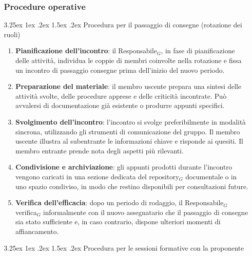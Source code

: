 \documentclass[a4paper, 10pt]{article}
\makeatletter
\renewcommand\paragraph{\@startsection{paragraph}{4}{\z@}%
  {3.25ex \@plus1ex \@minus .2ex}%
  {1.5ex \@plus .2ex}%
  {\normalfont\normalsize\bfseries}}
\makeatother
\begin{document}
\subsubsection{Procedure operative}
\label{subsubsec:procedure_formazione}

\paragraph{Procedura per il passaggio di consegne (rotazione dei ruoli)}

\begin{enumerate}
    \item \textbf{Pianificazione dell'incontro}: il Responsabile$_G$, in fase di pianificazione delle attività, individua le coppie di membri coinvolte nella rotazione e fissa un incontro di passaggio consegne prima dell'inizio del nuovo periodo.
    \item \textbf{Preparazione del materiale}: il membro uscente prepara una sintesi delle attività svolte, delle procedure apprese e delle criticità incontrate. Può avvalersi di documentazione già esistente o produrre appunti specifici.
    \item \textbf{Svolgimento dell'incontro}: l'incontro si svolge preferibilmente in modalità sincrona, utilizzando gli strumenti di comunicazione del gruppo. Il membro uscente illustra al subentrante le informazioni chiave e risponde ai quesiti. Il membro entrante prende nota degli aspetti più rilevanti.
    \item \textbf{Condivisione e archiviazione}: gli appunti prodotti durante l'incontro vengono caricati in una sezione dedicata del repository$_G$ documentale o in uno spazio condiviso, in modo che restino disponibili per consultazioni future.
    \item \textbf{Verifica dell'efficacia}: dopo un periodo di rodaggio, il Responsabile$_G$ verifica$_G$ informalmente con il nuovo assegnatario che il passaggio di consegne sia stato sufficiente e, in caso contrario, dispone ulteriori momenti di affiancamento.
\end{enumerate}

\paragraph{Procedura per le sessioni formative con la proponente}
\end{document}
